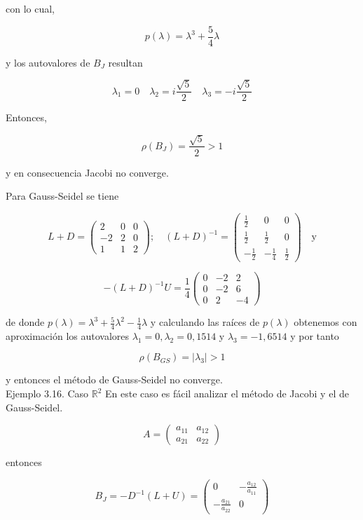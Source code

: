 \documentclass[10pt]{article}
\begin{document}
con lo cual,

$$
p(\lambda)=\lambda^{3}+\frac{5}{4} \lambda
$$

y los autovalores de $B_{J}$ resultan

$$
\lambda_{1}=0 \quad \lambda_{2}=i \frac{\sqrt{5}}{2} \quad \lambda_{3}=-i \frac{\sqrt{5}}{2}
$$

Entonces,

$$
\rho\left(B_{J}\right)=\frac{\sqrt{5}}{2}>1
$$

y en consecuencia Jacobi no converge.

Para Gauss-Seidel se tiene

$$
L+D=\left(\begin{array}{ccc}
2 & 0 & 0 \\
-2 & 2 & 0 \\
1 & 1 & 2
\end{array}\right) ; \quad(L+D)^{-1}=\left(\begin{array}{ccc}
\frac{1}{2} & 0 & 0 \\
\frac{1}{2} & \frac{1}{2} & 0 \\
-\frac{1}{2} & -\frac{1}{4} & \frac{1}{2}
\end{array}\right) \quad \mathrm{y}
$$

$$
-(L+D)^{-1} U=\frac{1}{4}\left(\begin{array}{ccc}
0 & -2 & 2 \\
0 & -2 & 6 \\
0 & 2 & -4
\end{array}\right)
$$

de donde $p(\lambda)=\lambda^{3}+\frac{5}{4} \lambda^{2}-\frac{1}{4} \lambda$ y calculando las raíces de $p(\lambda)$ obtenemos con aproximación los autovalores $\lambda_{1}=0, \lambda_{2}=0,1514$ y $\lambda_{3}=-1,6514$ y por tanto

$$
\rho\left(B_{G S}\right)=\left|\lambda_{3}\right|>1
$$

y entonces el método de Gauss-Seidel no converge.\\
Ejemplo 3.16. Caso $\mathbb{R}^{2}$ En este caso es fácil analizar el método de Jacobi y el de Gauss-Seidel.

$$
A=\left(\begin{array}{ll}
a_{11} & a_{12} \\
a_{21} & a_{22}
\end{array}\right)
$$

entonces

$$
B_{J}=-D^{-1}(L+U)=\left(\begin{array}{cc}
0 & -\frac{a_{12}}{a_{11}} \\
-\frac{a_{21}}{a_{22}} & 0
\end{array}\right)
$$
\end{document}
